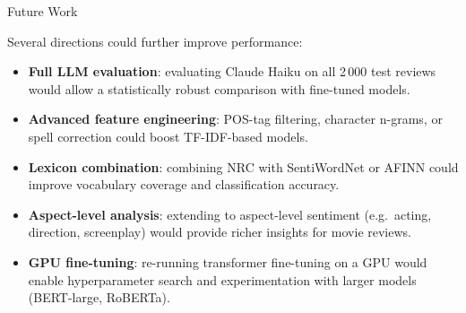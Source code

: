 \documentclass[12pt,reqno,twoside]{amsbook}
\makeatletter
\def\section{\@startsection{section}{1}%
      \z@{.5\linespacing\@plus.7\linespacing}{.25\linespacing}%
      {\normalfont\bfseries\flushleft}}
\theoremstyle{plain}
\numberwithin{equation}{chapter}
\numberwithin{section}{chapter}
\makeatother
\begin{document}
\section{Future Work}

\noindent Several directions could further improve performance:

\begin{itemize}[noitemsep]
  \item \textbf{Full LLM evaluation}: evaluating Claude Haiku on all 2\,000 test
        reviews would allow a statistically robust comparison with fine-tuned models.
  \item \textbf{Advanced feature engineering}: POS-tag filtering, character n-grams,
        or spell correction could boost TF-IDF-based models.
  \item \textbf{Lexicon combination}: combining NRC with SentiWordNet or AFINN
        could improve vocabulary coverage and classification accuracy.
  \item \textbf{Aspect-level analysis}: extending to aspect-level sentiment
        (e.g.\ acting, direction, screenplay) would provide richer insights for
        movie reviews.
  \item \textbf{GPU fine-tuning}: re-running transformer fine-tuning on a GPU
        would enable hyperparameter search and experimentation with larger models
        (BERT-large, RoBERTa).
\end{itemize}
\end{document}
